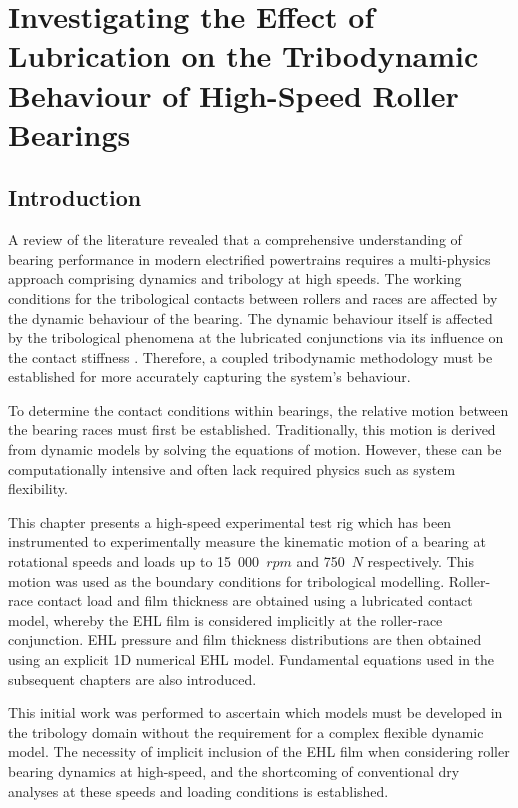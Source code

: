 \chapter{Investigating the Effect of Lubrication on the Tribodynamic Behaviour of High-Speed Roller Bearings}
\label{Investigating the Effect of Lubrication on the Tribodynamic Behaviour of High-Speed Roller Bearings}

\section{Introduction}

A review of the literature revealed that a comprehensive understanding of bearing performance in modern electrified powertrains requires a multi-physics approach comprising dynamics and tribology at high speeds. The working conditions for the tribological contacts between rollers and races are affected by the dynamic behaviour of the bearing. The dynamic behaviour itself is affected by the tribological phenomena at the lubricated conjunctions via its influence on the contact stiffness \cite{Nonato2014} \cite{Bizarre2018}. Therefore, a coupled tribodynamic methodology must be established for more accurately capturing the system’s behaviour.

To determine the contact conditions within bearings, the relative motion between the bearing races must first be established. Traditionally, this motion is derived from dynamic models by solving the equations of motion. However, these can be computationally intensive and often lack required physics such as system flexibility. 

This chapter presents a high-speed experimental test rig which has been instrumented to experimentally measure the kinematic motion of a bearing at rotational speeds and loads up to 15~000~$rpm$ and 750~$N$ respectively. This motion was used as the boundary conditions for tribological modelling. Roller-race contact load and film thickness are obtained using a lubricated contact model, whereby the EHL film is considered implicitly at the roller-race conjunction. EHL pressure and film thickness distributions are then obtained using an explicit 1D numerical EHL model. Fundamental equations used in the subsequent chapters are also introduced.

This initial work was performed to ascertain which models must be developed in the tribology domain without the requirement for a complex flexible dynamic model. The necessity of implicit inclusion of the EHL film when considering roller bearing dynamics at high-speed, and the shortcoming of conventional dry analyses at these speeds and loading conditions is established.

